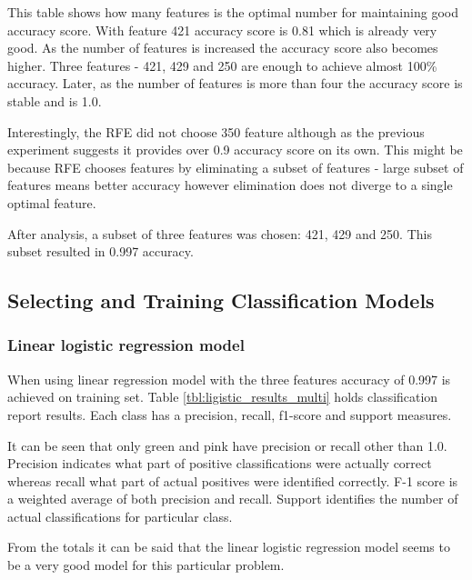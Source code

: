 \documentclass[11pt]{article}
\begin{document}
		This table shows how many features is the optimal number for maintaining good accuracy score. With feature 421 accuracy score is 0.81 which is already very good. As the number of features is increased the accuracy score also becomes higher. Three features - 421, 429 and 250 are enough to achieve almost 100\% accuracy. Later, as the number of features is more than four the accuracy score is stable and is 1.0.

		Interestingly, the RFE did not choose 350 feature although as the previous experiment suggests it provides over 0.9 accuracy score on its own. This might be because RFE chooses features by eliminating a subset of features - large subset of features means better accuracy however elimination does not diverge to a single optimal feature. 

		After analysis, a subset of three features was chosen: 421, 429 and 250. This subset resulted in 0.997 accuracy.

		\subsection{Selecting and Training Classification Models}
			\subsubsection{Linear logistic regression model}
 			 	When using linear regression model with the three features accuracy of 0.997 is achieved on training set. Table \ref{tbl:ligistic_results_multi} holds classification report results. Each class has a precision, recall, f1-score and support measures. 

 			 	It can be seen that only green and pink have precision or recall other than 1.0. Precision indicates what part of positive classifications were actually correct whereas recall what part of actual positives were identified correctly. F-1 score is a weighted average of both precision and recall. Support identifies the number of actual classifications for particular class.

 			 	From the totals it can be said that the linear logistic regression model seems to be a very good model for this particular problem. 
\end{document}
